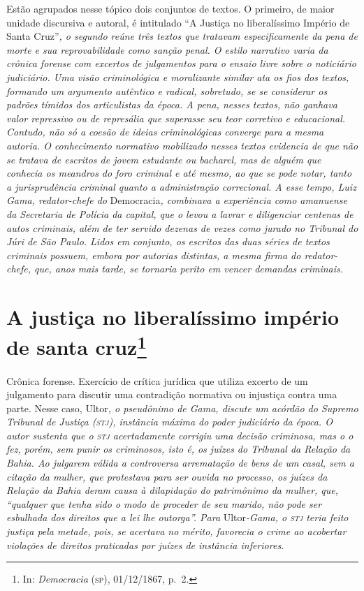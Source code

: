 \begin{argumento}
Estão agrupados nesse tópico dois conjuntos de textos. O primeiro, de
maior unidade discursiva e autoral, é intitulado ``A Justiça no
liberalíssimo Império de Santa Cruz''\emph{, o segundo reúne três textos
que tratavam especificamente da pena de morte e sua reprovabilidade como
sanção penal. O estilo narrativo varia da crônica forense com excertos
de julgamentos para o ensaio livre sobre o noticiário judiciário. Uma
visão criminológica e moralizante similar ata os fios dos textos,
formando um argumento autêntico e radical, sobretudo, se se considerar
os padrões tímidos dos articulistas da época. A pena, nesses textos, não
ganhava valor repressivo ou de represália que superasse seu teor
corretivo e educacional. Contudo, não só a coesão de ideias
criminológicas converge para a mesma autoria. O conhecimento normativo
mobilizado nesses textos evidencia de que não se tratava de escritos de
jovem estudante ou bacharel, mas de alguém que conhecia os meandros do
foro criminal e até mesmo, ao que se pode notar, tanto a jurisprudência
criminal quanto a administração correcional. A esse tempo, Luiz Gama,
redator-chefe do} Democracia\emph{, combinava a experiência como
amanuense da Secretaria de Polícia da capital, que o levou a lavrar e
diligenciar centenas de autos criminais, além de ter servido dezenas de
vezes como jurado no Tribunal do Júri de São Paulo. Lidos em conjunto,
os escritos das duas séries de textos criminais possuem, embora por
autorias distintas, a mesma firma do redator-chefe, que, anos mais
tarde, se tornaria perito em vencer demandas criminais.}
\end{argumento}

\chapter{A justiça no liberalíssimo império de santa cruz\footnote{In:
  \emph{Democracia} (\textsc{sp}), 01/12/1867, p.~2.}}

\begin{didascalia}
Crônica forense. Exercício de crítica jurídica que utiliza excerto de um
julgamento para discutir uma contradição normativa ou injustiça contra
uma parte. Nesse caso, Ultor\emph{, o pseudônimo de Gama, discute um
acórdão do Supremo Tribunal de Justiça (\textsc{stj}), instância máxima do poder
judiciário da época. O autor sustenta que o \textsc{stj} acertadamente corrigiu
uma decisão criminosa, mas o o fez, porém, sem punir os criminosos, isto
é, os juízes do Tribunal da Relação da Bahia. Ao julgarem válida a
controversa arrematação de bens de um casal, sem a citação da mulher,
que protestava para ser ouvida no processo, os juízes da Relação da
Bahia deram causa à dilapidação do patrimônimo da mulher, que, ``qualquer
que tenha sido o modo de proceder de seu marido, não pode ser esbulhada
dos direitos que a lei lhe outorga''. Para} Ultor\emph{-Gama, o \textsc{stj} teria
feito justiça pela metade, pois, se acertava no mérito, favorecia o
crime ao acobertar violações de direitos praticadas por juízes de
instância inferiores.}
\end{didascalia}



